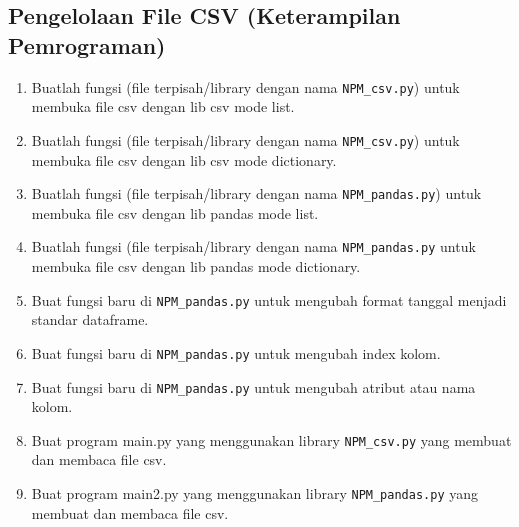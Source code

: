 \subsection{Pengelolaan File CSV (Keterampilan Pemrograman)}
\begin{enumerate}
    \item Buatlah  fungsi  (file  terpisah/library  dengan  nama  \verb|NPM_csv.py|)  untuk  membuka file csv dengan lib csv mode list.
    
    

    \item Buatlah  fungsi  (file  terpisah/library  dengan  nama  \verb|NPM_csv.py|)  untuk  membuka file csv dengan lib csv mode dictionary.
   	
   	

	\item Buatlah fungsi (file terpisah/library dengan nama \verb|NPM_pandas.py|) untuk membuka file csv dengan lib pandas mode list.
	
	
		
	\item Buatlah fungsi (file terpisah/library dengan nama \verb|NPM_pandas.py| untuk membuka file csv dengan lib pandas mode dictionary.

	

	\item Buat fungsi baru di \verb|NPM_pandas.py| untuk mengubah format tanggal menjadi standar dataframe.

	

	\item Buat fungsi baru di \verb|NPM_pandas.py| untuk mengubah index kolom.
	
	
	
	\item Buat fungsi baru di \verb|NPM_pandas.py| untuk mengubah atribut atau nama kolom.
	
	
	
	\item Buat program main.py yang menggunakan library \verb|NPM_csv.py| yang membuat dan membaca file csv.
	
	
	
	\item Buat program main2.py yang menggunakan library \verb|NPM_pandas.py| yang membuat dan membaca file csv.

	
\end{enumerate} 


